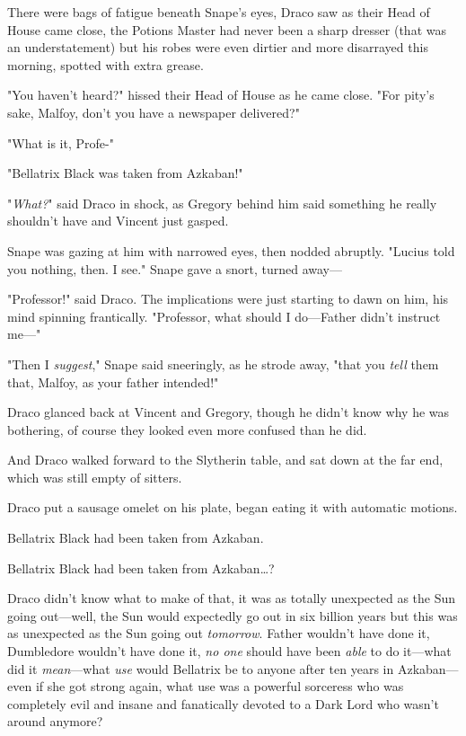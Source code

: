 There were bags of fatigue beneath Snape's eyes, Draco saw as their Head of 
House came close, the Potions Master had never been a sharp dresser (that was 
an understatement) but his robes were even dirtier and more disarrayed this 
morning, spotted with extra grease.

"You haven't heard?" hissed their Head of House as he came close. "For pity's 
sake, Malfoy, don't you have a newspaper delivered?"

"What is it, Profe-"

"Bellatrix Black was taken from Azkaban!"

"\emph{What?}" said Draco in shock, as Gregory behind him said something he 
really shouldn't have and Vincent just gasped.

Snape was gazing at him with narrowed eyes, then nodded abruptly. "Lucius told 
you nothing, then. I see." Snape gave a snort, turned away---

"Professor!" said Draco. The implications were just starting to dawn on him, 
his mind spinning frantically. "Professor, what should I do---Father didn't 
instruct me---"

"Then I \emph{suggest}," Snape said sneeringly, as he strode away, "that you 
\emph{tell} them that, Malfoy, as your father intended!"

Draco glanced back at Vincent and Gregory, though he didn't know why he was 
bothering, of course they looked even more confused than he did.

And Draco walked forward to the Slytherin table, and sat down at the far end, 
which was still empty of sitters.

Draco put a sausage omelet on his plate, began eating it with automatic motions.

Bellatrix Black had been taken from Azkaban.

Bellatrix Black had been taken from Azkaban{\ldots}?

Draco didn't know what to make of that, it was as totally unexpected as the Sun 
going out---well, the Sun would expectedly go out in six billion years but this 
was as unexpected as the Sun going out \emph{tomorrow}. Father wouldn't have 
done it, Dumbledore wouldn't have done it, \emph{no one} should have been 
\emph{able} to do it---what did it \emph{mean}---what \emph{use} would 
Bellatrix be to anyone after ten years in Azkaban---even if she got strong 
again, what use was a powerful sorceress who was completely evil and insane and 
fanatically devoted to a Dark Lord who wasn't around anymore?

